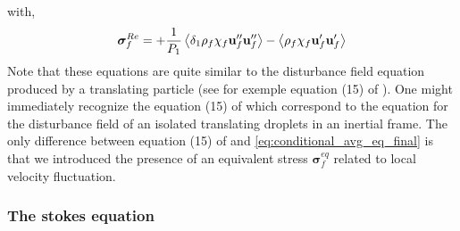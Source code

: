 with, 
\begin{equation*}
    \bm\sigma^{Re}_f
    =
    + \frac{1}{P_1}\left<\delta_1\rho_f\chi_f\textbf{u}_f''\textbf{u}_f''\right>
    - \left<\rho_f\chi_f\textbf{u}_f'\textbf{u}_f'\right>
\end{equation*}
Note that these equations are quite similar to the disturbance field equation produced by a translating particle (see for exemple equation (15) of \citet{maxey1983equation}). 
One might immediately recognize the equation (15) of \citep{maxey1983equation} which correspond to the equation for the disturbance field of an isolated translating droplets in an inertial frame. 
The only difference between equation (15) of \citep{maxey1983equation} and \ref{eq:conditional_avg_eq_final} is that we introduced the presence of an equivalent stress $\bm\sigma_f^{eq}$ related to local velocity fluctuation. 

\subsubsection{The stokes equation}

